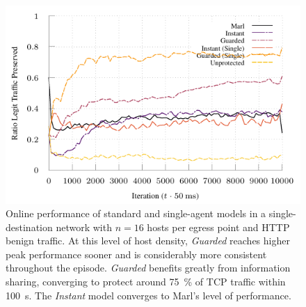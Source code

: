 \documentclass[10pt, times, conference, letterpaper]{IEEEtran}
\begin{document}
\begin{figure}
	\centering
	\includegraphics[width=0.95\linewidth]{../plots/tnsm-tcp-16-single}
	
	\caption{
		Online performance of standard and single-agent models in a single-destination network with $n=16$ hosts per egress point and HTTP benign traffic.
		At this level of host density, \emph{Guarded} reaches higher peak performance sooner and is considerably more consistent throughout the episode.
		\emph{Guarded} benefits greatly from information sharing, converging to protect around \SI{75}{\percent} of TCP traffic within \SI{100}{\second}.
		The \emph{Instant} model converges to Marl's level of performance.
		\label{fig:tcp-tree-16}
	}
\end{figure}

%	

%	
\end{document}
